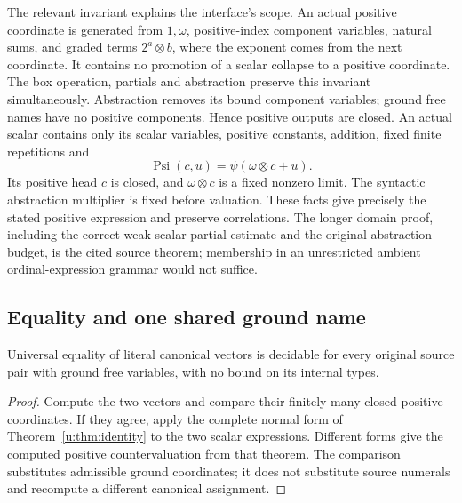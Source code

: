 The relevant invariant explains the interface's scope.  An actual positive
coordinate is generated from $1,\omega$, positive-index component
variables, natural sums, and graded terms
$2^a\otimes b$, where the exponent comes from the next coordinate.
It contains no promotion of a scalar collapse to a positive coordinate.
The box operation, partials and abstraction preserve this invariant
simultaneously.  Abstraction removes its bound component variables;
ground free names have no positive components.  Hence positive outputs
are closed.  An actual scalar contains only its scalar variables,
positive constants, addition, fixed finite repetitions and
\[
 \operatorname{Psi}(c,u)=\psi(\omega\otimes c+u).
\]
Its positive head $c$ is closed, and $\omega\otimes c$ is a fixed
nonzero limit.  The syntactic abstraction multiplier is fixed before
valuation.  These facts give precisely the stated positive expression
and preserve correlations.  The longer domain proof, including the
correct weak scalar partial estimate and the original abstraction
budget, is the cited source theorem; membership in an unrestricted
ambient ordinal-expression grammar would not suffice.

\subsection{Equality and one shared ground name}

\begin{corollary}
\label{cor:source-equality}
Universal equality of literal canonical vectors is decidable for every
original source pair with ground free variables, with no bound on its
internal types.
\end{corollary}
\begin{proof}
Compute the two vectors and compare their finitely many closed positive
coordinates.  If they agree, apply the complete normal form of
Theorem~\ref{u:thm:identity} to the two scalar expressions.
Different forms give the computed positive countervaluation from that
theorem.  The comparison substitutes admissible ground coordinates;
it does not substitute source numerals and recompute a different
canonical assignment.
\end{proof}

